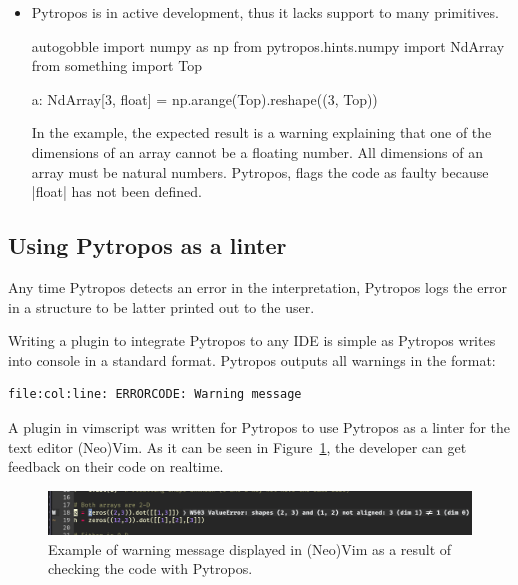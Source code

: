 \begin{itemize}
\item Pytropos is in active development, thus it lacks support to many primitives.

  \begin{pythoncode*}{autogobble}
    import numpy as np
    from pytropos.hints.numpy import NdArray
    from something import Top

    a: NdArray[3, float] = np.arange(Top).reshape((3, Top))
  \end{pythoncode*}

  In the example, the expected result is a warning explaining that one of the dimensions
  of an array cannot be a floating number. All dimensions of an array must be natural
  numbers. Pytropos, flags the code as faulty because \pycode|float| has not been defined.

\end{itemize}


\subsection{Using Pytropos as a linter}

Any time Pytropos detects an error in the interpretation, Pytropos logs the error in a
structure to be latter printed out to the user.

Writing a plugin to integrate Pytropos to any IDE is simple as Pytropos writes into console
in a standard format. Pytropos outputs all warnings in the format:

\begin{verbatim}
file:col:line: ERRORCODE: Warning message
\end{verbatim}

A plugin in vimscript was written for Pytropos to use Pytropos as a linter for the text
editor (Neo)Vim. As it can be seen in Figure~\ref{pytroposlinter}, the developer can get
feedback on their code on realtime.

\begin{figure}
\includegraphics[width=\textwidth]{figures/neovim-linter.png}
\caption{Example of warning message displayed in (Neo)Vim as a result of checking the code
  with Pytropos.\label{pytroposlinter}}
\end{figure}

